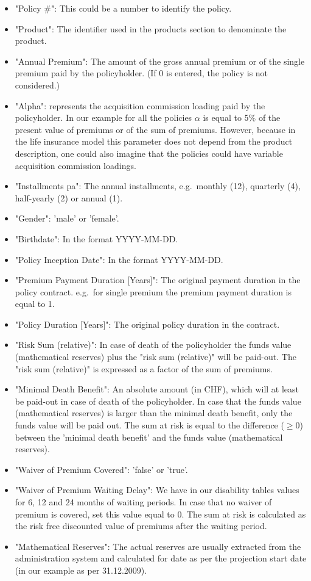 \begin{itemize}
	\item "Policy \#": This could be a number to identify the policy.
	\item "Product": The identifier used in the products section to denominate the product.
	\item "Annual Premium": The amount of the gross annual premium or of the single premium paid by the policyholder. (If 0 is entered, the policy is not considered.)
	\item "Alpha": represents the acquisition commission loading paid by the policyholder. In our example for all the policies $\alpha$ is equal to 5\% of the present value of premiums or of the sum of premiums. However, because in the life insurance model this parameter does not depend from the product description, one could also imagine that the policies could have variable acquisition commission loadings.
	\item "Installments pa": The annual installments, e.g.~monthly (12), quarterly (4), half-yearly (2) or annual (1).
	\item "Gender": 'male' or 'female'.
	\item "Birthdate": In the format YYYY-MM-DD.
	\item "Policy Inception Date": In the format YYYY-MM-DD.
	\item "Premium Payment Duration [Years]": The original payment duration in the policy contract. e.g.~for single premium the premium payment duration is equal to 1.
	\item "Policy Duration [Years]": The original policy duration in the contract.
	\item "Risk Sum (relative)": In case of death of the policyholder the funds value (mathematical reserves) plus the "risk sum (relative)" will be paid-out. The "risk sum (relative)" is expressed as a factor of the sum of premiums.
	\item "Minimal Death Benefit": An absolute amount (in CHF), which will at least be paid-out in case of death of the policyholder. In case that the funds value (mathematical reserves) is larger than the minimal death benefit, only the funds value will be paid out. The sum at risk is equal to the difference ($\geq 0$) between the 'minimal death benefit' and the funds value (mathematical reserves).
	\item "Waiver of Premium Covered": 'false' or 'true'.
	\item "Waiver of Premium Waiting Delay": We have in our disability tables values for 6, 12 and 24 months of waiting periods. In case that no waiver of premium is covered, set this value equal to 0. The sum at risk is calculated as the risk free discounted value of premiums after the waiting period.
	\item "Mathematical Reserves": The actual reserves are usually extracted from the administration system and calculated for date as per the projection start date (in our example as per 31.12.2009).

\end{itemize}

